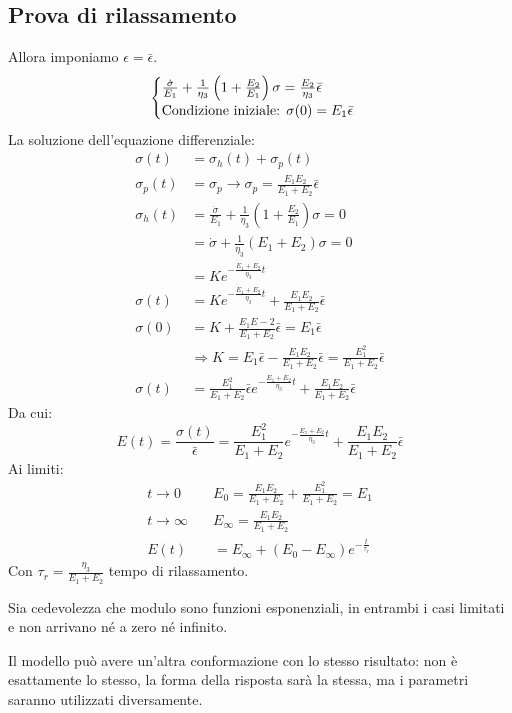 \subsection{Prova di rilassamento}
Allora imponiamo $\epsilon = \bar{\epsilon}$.
\begin{equation}
\begin{cases}
\frac{\dot{\sigma}}{E_1} + \frac{1}{\eta_3}\left(1 + \frac{E_2}{E_1}\right)\sigma = \frac{E_2}{\eta_3}\bar{\epsilon}\\
\textup{Condizione iniziale: } \sigma(0) = E_1\bar{\epsilon}\\
\end{cases}
\end{equation}
La soluzione dell'equazione differenziale:
\begin{equation}
\begin{split}
\sigma(t) &= \sigma_h(t) + \sigma_p(t)\\
\sigma_p(t) &= \sigma_p \rightarrow \sigma_p = \frac{E_1 E_2}{E_1+E_2}\bar{\epsilon}\\
\sigma_h(t) &= \frac{\dot{\sigma}}{E_1} + \frac{1}{\eta_3}\left(1+\frac{E_2}{E_1}\right)\sigma = 0\\
&= \dot{\sigma} + \frac{1}{\eta_3}\left(E_1 + E_2\right)\sigma = 0\\
&= K e^{-\frac{E_1+E_2}{\eta_3}t}\\
\sigma(t) &= Ke^{-\frac{E_1+E_2}{\eta_3}t} + \frac{E_1E_2}{E_1+E_2}\bar{\epsilon}\\
\sigma(0) &= K + \frac{E_1E-2}{E_1 + E_2}\bar{\epsilon} = E_1\bar{\epsilon}\\
&\Rightarrow K = E_1\bar{\epsilon}-\frac{E_1E_2}{E_1+E_2}\bar{\epsilon} = \frac{E_1^2}{E_1+E_2}\bar{\epsilon}\\
\sigma(t) &= \frac{E_1^2}{E_1+E_2}\bar{\epsilon}e^{-\frac{E_1+E_2}{\eta_3}t}+\frac{E_1E_2}{E_1+E_2}\bar{\epsilon}
\end{split}
\end{equation}
Da cui:
\begin{equation}
E(t) = \frac{\sigma(t)}{\bar{\epsilon}} = \frac{E_1^2}{E_1+E_2}e^{-\frac{E_1+E_2}{\eta_3}t}+\frac{E_1E_2}{E_1+E_2}\bar{\epsilon}
\end{equation}
Ai limiti:
\begin{equation}
\begin{split}
t \rightarrow 0 \quad &E_0 = \frac{E_1E_2}{E_1+E_2}+\frac{E_1^2}{E_1+E_2} = E_1\\
t \rightarrow \infty \quad &E_{\infty} = \frac{E_1E_2}{E_1+E_2}\\
E(t) &= E_{\infty} + (E_0 - E_{\infty})e^{-\frac{t}{\tau_r}}
\end{split}
\end{equation}
Con $\tau_r = \frac{\eta_3}{E_1+E_2}$ tempo di rilassamento.

Sia cedevolezza che modulo sono funzioni esponenziali, in entrambi i casi limitati e non arrivano né a zero né infinito.

Il modello  può avere un'altra conformazione con lo stesso risultato: non è esattamente lo stesso, la forma della risposta sarà la stessa, ma i parametri saranno utilizzati diversamente.